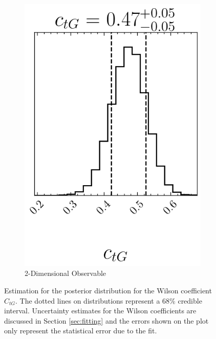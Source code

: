 \documentclass[a4paper,11pt]{article}
\begin{document}
\begin{figure}[htb]
\begin{subfigure}[b]{0.3\textwidth}
        \includegraphics[width=\textwidth]{plots/ATLAS-ctg_2D_1OP.png}
        \caption{2-Dimensional Observable}
    \end{subfigure}
    \caption{Estimation for the posterior distribution for the Wilson coefficient $C_{tG}$. The dotted lines on distributions represent a 68\% credible interval. Uncertainty estimates for the Wilson coefficients are discussed in Section \ref{sec:fitting} and the errors shown on the plot only represent the statistical error due to the fit.}
    \label{fig:corner_1OP}
\end{figure}
\end{document}

